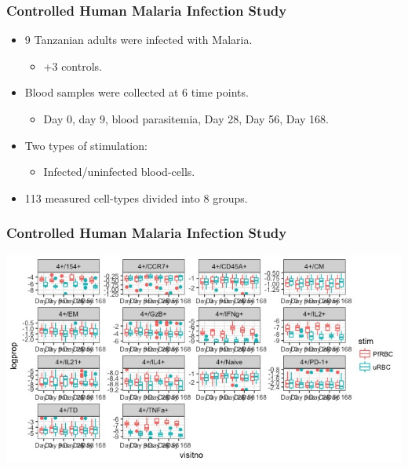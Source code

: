 \documentclass{beamer}
\theoremstyle{definition}
\begin{document}
\begin{frame}
\frametitle{Controlled Human Malaria Infection Study}
\begin{itemize}
\item 9 Tanzanian adults were infected with Malaria.
	\begin{itemize}
	\item +3 controls.
	\end{itemize}
	\vspace{0.75 cm}
	
\item Blood samples were collected at 6 time points.
	\begin{itemize}
	\item Day 0, day 9, blood  parasitemia, Day 28, Day 56, Day 168.
	\end{itemize}
	\vspace{0.75 cm}

\item Two types of stimulation:
	\begin{itemize}
	\item Infected/uninfected blood-cells.
	\end{itemize}
	\vspace{0.75 cm}
	
\item 113 measured cell-types divided into 8 groups. 
\end{itemize}
\end{frame}


\begin{frame}
\frametitle{Controlled Human Malaria Infection Study}
\begin{center}
\includegraphics[scale=0.475]{figures/CHMIboxplot}
\end{center}
\end{frame}
\end{document}
